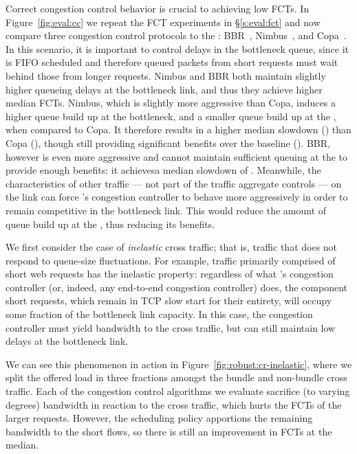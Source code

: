  Correct congestion control behavior is crucial to achieving low FCTs.
In Figure~\ref{fig:eval:cc} we repeat the FCT experiments in \S\ref{s:eval:fct} and now compare three congestion control protocols to the \baseline: BBR~\cite{bbr}, Nimbus~\cite{nimbus}, and Copa~\cite{copa}.
In this scenario, it is important to control delays in the bottleneck queue, since it is FIFO scheduled and therefore queued packets from short requests must wait behind those from longer requests. 
Nimbus and BBR both maintain slightly higher queueing delays at the bottleneck link, and thus they achieve higher median FCTs. 
Nimbus, which is slightly more aggressive than Copa, induces a higher queue build up at the bottleneck, and a smaller queue build up at the \name, when compared to Copa. It therefore results in a higher median slowdown (\ccNimbusMedian) than Copa (\ccCopaMedian), though still providing significant benefits over the baseline (\ccBaselineMedian). 
BBR, however is even more aggressive and cannot maintain sufficient queuing at the \name to provide enough benefits: it achievesa median slowdown of \ccBBRMedian.
Meanwhile, the characteristics of other traffic --- not part of the traffic aggregate \name controls --- on the link can force \name's congestion controller to behave more aggressively in order to remain competitive in the bottleneck link. This would reduce the amount of queue build up at the \name, thus reducing its benefits.


 We first consider the case of \emph{inelastic} cross traffic; that is, traffic that does not respond to queue-size fluctuations.
For example, traffic primarily comprised of short web requests has the inelastic property: regardless of what \name's congestion controller (or, indeed, any end-to-end congestion controller) does, the component short requests, which remain in TCP slow start for their entirety, will occupy some fraction of the bottleneck link capacity.
In this case, the congestion controller must yield bandwidth to the cross traffic, but can still maintain low delays at the bottleneck link.

We can see this phenomenon in action in Figure~\ref{fig:robust:cr-inelastic}, where we split the offered load in three fractions amongst the bundle and non-bundle cross traffic. 
Each of the congestion control algorithms we evaluate sacrifice (to varying degrees) bandwidth in reaction to the cross traffic, which hurts the FCTs of the larger requests.
However, the scheduling policy apportions the remaining bandwidth to the short flows, so there is still an improvement in FCTs at the median.

